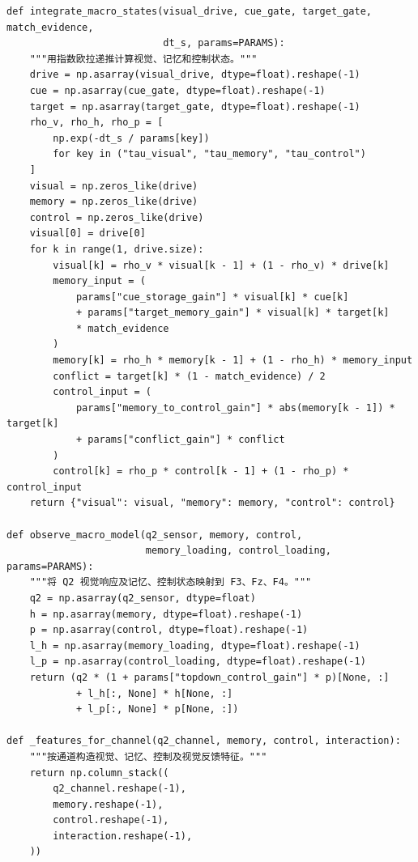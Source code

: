 \begin{appendices}
\begin{lstlisting}[style=appendixPython]
def integrate_macro_states(visual_drive, cue_gate, target_gate, match_evidence,
                           dt_s, params=PARAMS):
    """用指数欧拉递推计算视觉、记忆和控制状态。"""
    drive = np.asarray(visual_drive, dtype=float).reshape(-1)
    cue = np.asarray(cue_gate, dtype=float).reshape(-1)
    target = np.asarray(target_gate, dtype=float).reshape(-1)
    rho_v, rho_h, rho_p = [
        np.exp(-dt_s / params[key])
        for key in ("tau_visual", "tau_memory", "tau_control")
    ]
    visual = np.zeros_like(drive)
    memory = np.zeros_like(drive)
    control = np.zeros_like(drive)
    visual[0] = drive[0]
    for k in range(1, drive.size):
        visual[k] = rho_v * visual[k - 1] + (1 - rho_v) * drive[k]
        memory_input = (
            params["cue_storage_gain"] * visual[k] * cue[k]
            + params["target_memory_gain"] * visual[k] * target[k]
            * match_evidence
        )
        memory[k] = rho_h * memory[k - 1] + (1 - rho_h) * memory_input
        conflict = target[k] * (1 - match_evidence) / 2
        control_input = (
            params["memory_to_control_gain"] * abs(memory[k - 1]) * target[k]
            + params["conflict_gain"] * conflict
        )
        control[k] = rho_p * control[k - 1] + (1 - rho_p) * control_input
    return {"visual": visual, "memory": memory, "control": control}

def observe_macro_model(q2_sensor, memory, control,
                        memory_loading, control_loading, params=PARAMS):
    """将 Q2 视觉响应及记忆、控制状态映射到 F3、Fz、F4。"""
    q2 = np.asarray(q2_sensor, dtype=float)
    h = np.asarray(memory, dtype=float).reshape(-1)
    p = np.asarray(control, dtype=float).reshape(-1)
    l_h = np.asarray(memory_loading, dtype=float).reshape(-1)
    l_p = np.asarray(control_loading, dtype=float).reshape(-1)
    return (q2 * (1 + params["topdown_control_gain"] * p)[None, :]
            + l_h[:, None] * h[None, :]
            + l_p[:, None] * p[None, :])

def _features_for_channel(q2_channel, memory, control, interaction):
    """按通道构造视觉、记忆、控制及视觉反馈特征。"""
    return np.column_stack((
        q2_channel.reshape(-1),
        memory.reshape(-1),
        control.reshape(-1),
        interaction.reshape(-1),
    ))


\end{lstlisting}
\end{appendices}
